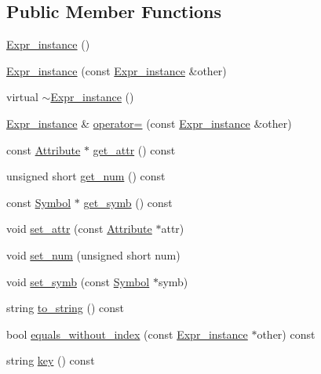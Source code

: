 \subsection*{Public Member Functions}
\begin{CompactItemize}
\item 
\hyperlink{classgenevalmag_1_1Expr__instance_f83f87581558a7d2c05f18a1678050a2}{Expr\_\-instance} ()
\item 
\hyperlink{classgenevalmag_1_1Expr__instance_52ec40835f95f35c7131036873e1a14d}{Expr\_\-instance} (const \hyperlink{classgenevalmag_1_1Expr__instance}{Expr\_\-instance} \&other)
\item 
virtual \hyperlink{classgenevalmag_1_1Expr__instance_94630f2be9c5cceb11992086b34c52a4}{$\sim$Expr\_\-instance} ()
\item 
\hyperlink{classgenevalmag_1_1Expr__instance}{Expr\_\-instance} \& \hyperlink{classgenevalmag_1_1Expr__instance_4af9be1f881e4c3aa29d548477fb1c7c}{operator=} (const \hyperlink{classgenevalmag_1_1Expr__instance}{Expr\_\-instance} \&other)
\item 
const \hyperlink{classgenevalmag_1_1Attribute}{Attribute} $\ast$ \hyperlink{classgenevalmag_1_1Expr__instance_18d92b87a30dbf2ca3833e075f76d52e}{get\_\-attr} () const 
\item 
unsigned short \hyperlink{classgenevalmag_1_1Expr__instance_5b5bc716afa9f85418c7f58ed0ac0c01}{get\_\-num} () const 
\item 
const \hyperlink{classgenevalmag_1_1Symbol}{Symbol} $\ast$ \hyperlink{classgenevalmag_1_1Expr__instance_5327a138bd6dc934ce89d878d973bfb0}{get\_\-symb} () const 
\item 
void \hyperlink{classgenevalmag_1_1Expr__instance_66ddf26666df395c4da1abab5f8d22a9}{set\_\-attr} (const \hyperlink{classgenevalmag_1_1Attribute}{Attribute} $\ast$attr)
\item 
void \hyperlink{classgenevalmag_1_1Expr__instance_bcd585b490f6fb7ad56de91287853a37}{set\_\-num} (unsigned short num)
\item 
void \hyperlink{classgenevalmag_1_1Expr__instance_b1ba139af4ef942599e8882e7201e1f5}{set\_\-symb} (const \hyperlink{classgenevalmag_1_1Symbol}{Symbol} $\ast$symb)
\item 
string \hyperlink{classgenevalmag_1_1Expr__instance_2186bb2f69173f709cfb75435b32da94}{to\_\-string} () const 
\item 
bool \hyperlink{classgenevalmag_1_1Expr__instance_fc3206f63c77c3fc8bbfdf4d2ef7de2e}{equals\_\-without\_\-index} (const \hyperlink{classgenevalmag_1_1Expr__instance}{Expr\_\-instance} $\ast$other) const 
\item 
string \hyperlink{classgenevalmag_1_1Expr__instance_0a08cd791001f10ccb4020c5b9279823}{key} () const 
\end{CompactItemize}

